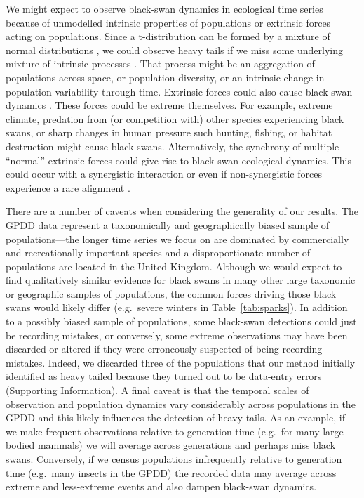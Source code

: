 We might expect to observe black-swan dynamics in ecological time series
because of unmodelled intrinsic properties of populations or extrinsic forces
acting on populations. Since a t-distribution can be formed by a mixture of
normal distributions \citep[with the same mean and inverse-gamma-distributed
variances,][]{gelman2014}, we could observe heavy tails if we miss some
underlying mixture of intrinsic processes \citep{allen2001}. That process
might be an aggregation of populations across space, or population diversity,
or an intrinsic change in population variability through time. Extrinsic
forces could also cause black-swan dynamics \citep[e.g.][]{nunez2012}. These
forces could be extreme themselves. For example, extreme climate, predation
from (or competition with) other species experiencing black swans, or sharp
changes in human pressure such hunting, fishing, or habitat destruction might
cause black swans. Alternatively, the synchrony of multiple ``normal''
extrinsic forces could give rise to black-swan ecological dynamics. This could
occur with a synergistic interaction \citep[e.g.][]{kirby2009} or even if
non-synergistic forces experience a rare alignment \citep{denny2009}.

There are a number of caveats when considering the generality of our results.
The GPDD data represent a taxonomically and geographically biased sample of
populations---the longer time series we focus on are dominated by commercially
and recreationally important species and a disproportionate number of
populations are located in the United Kingdom. Although we would expect to
find qualitatively similar evidence for black swans in many other large
taxonomic or geographic samples of populations, the common forces driving
those black swans would likely differ (e.g.~severe winters in
Table~\ref{tab:sparks}). In addition to a possibly biased sample of
populations, some black-swan detections could just be recording mistakes, or
conversely, some extreme observations may have been discarded or altered if
they were erroneously suspected of being recording mistakes. Indeed, we
discarded three of the populations that our method initially identified as
heavy tailed because they turned out to be data-entry errors (Supporting
Information). A final caveat is that the temporal scales of observation and
population dynamics vary considerably across populations in the GPDD and this
likely influences the detection of heavy tails. As an example, if we make
frequent observations relative to generation time (e.g.~for many large-bodied
mammals) we will average across generations and perhaps miss black swans.
Conversely, if we census populations infrequently relative to generation time
(e.g.~many insects in the GPDD) the recorded data may average across extreme
and less-extreme events and also dampen black-swan dynamics.

